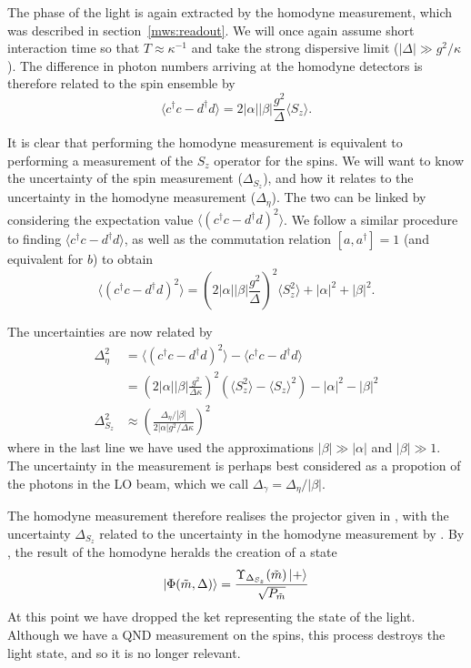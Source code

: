 The phase of the light is again extracted by the homodyne measurement, which
was described in section~\ref{mws:readout}. We will once again assume short
interaction time so that $T\approx\kappa^{-1}$ and take the strong dispersive
limit ($|\Delta| \gg g^2/\kappa$). The difference in photon numbers arriving at
the homodyne detectors is therefore related to the spin ensemble by
%
\begin{equation}
  \langle c^\dagger c - d^\dagger d\rangle = 2|\alpha||\beta|
  \frac{g^2}{\Delta}\langle S_z\rangle.
  \label{eqn:homomeas}
\end{equation}

It is clear that performing the homodyne measurement is equivalent to
performing a measurement of the $S_z$ operator for the spins. We will want to
know the uncertainty of the spin measurement ($\Delta_{S_z}$), and how it
relates to the uncertainty in the homodyne measurement ($\Delta_\eta$). The two
can be linked by considering the expectation value $\langle (c^\dagger c -
d^\dagger d)^2 \rangle$.
We follow a similar procedure to finding $\langle c^\dagger c - d^\dagger d
\rangle$, as well as the commutation relation $[a,a^\dagger] = 1$ (and
equivalent for $b$) to obtain
%
\begin{equation}
  \langle (c^\dagger c - d^\dagger d)^2 \rangle = (2|\alpha||\beta|
  \frac{g^2}{\Delta})^2\langle S_z^2\rangle + |\alpha|^2+|\beta|^2.
\end{equation}

The uncertainties are now related by
%
\begin{align}
  \Delta_\eta^2 &= \langle (c^\dagger c - d^\dagger d)^2 \rangle - \langle
  c^\dagger c - d^\dagger d\rangle \\
  &= (2|\alpha||\beta| \frac{g^2}{\Delta\kappa})^2(\langle S_z^2\rangle - \langle
  S_z\rangle^2) - |\alpha|^2 - |\beta|^2 \\
  \Delta_{S_z}^2
  &\approx \left(\frac{\Delta_\eta/|\beta|}{2|\alpha|g^2/\Delta\kappa}\right)^2
  \label{squeeze:eqn:homouncert}
\end{align}
%
where in the last line we have used the approximations $|\beta| \gg |\alpha|$
and $|\beta|\gg 1$. The uncertainty in the measurement is perhaps best
considered as a propotion of the photons in the LO beam, which we call
$\Delta_\gamma = \Delta_\eta/|\beta|$.

The homodyne measurement therefore realises the projector given in
, with the uncertainty 
$\Delta_{S_z}$ related to the uncertainty in the homodyne measurement by
. By , the
result of the homodyne heralds the creation of a state
%
\begin{equation}
  \ket{\Phi(\tilde{m}, \Delta)} = \frac{\Upsilon_{\Delta_{S_z}} (\tilde{m})\ket{+}}{ \sqrt{P_{\tilde{m}}} }
\end{equation}
%
At this point we have dropped the ket representing the state of the light.
Although we have a QND measurement on the spins, this process destroys the
light state, and so it is no longer relevant.

